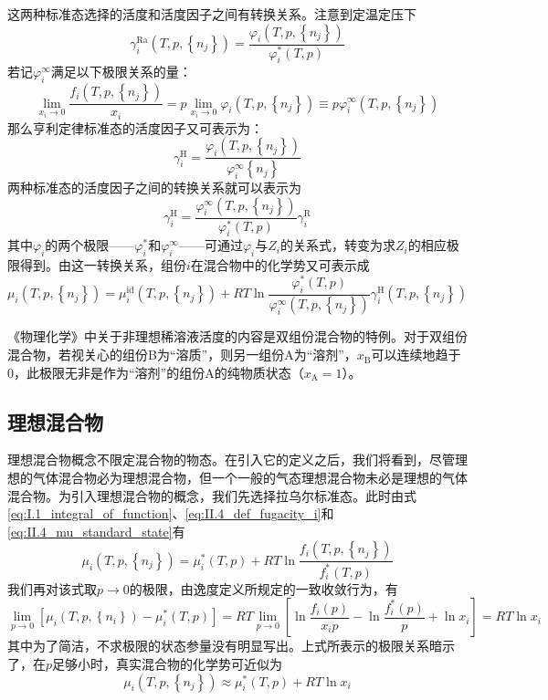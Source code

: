\documentclass[main.tex]{subfiles}
\begin{document}
这两种标准态选择的活度和活度因子之间有转换关系。注意到定温定压下
\[\gamma_i^\text{Ra}\left(T,p,\left\{n_j\right\}\right)              =\frac{\varphi_i\left(T,p,\left\{n_j\right\}\right)}{\varphi_i^*\left(T,p\right)}\]
若记$\varphi_i^\infty$满足以下极限关系的量：
\[  \lim_{x_i\to 0}\frac{f_i\left(T,p,\left\{n_j\right\}\right)}{x_i}  =p\lim_{x_i\to 0}\varphi_i\left(T,p,\left\{n_j\right\}\right)\equiv p\varphi_i^\infty\left(T,p,\left\{n_j\right\}\right)\]
那么亨利定律标准态的活度因子又可表示为：
\[\gamma_i^\text{H}=\frac{\varphi_i\left(T,p,\left\{n_j\right\}\right)}{\varphi_i^\infty\left\{n_j\right\}}\]
两种标准态的活度因子之间的转换关系就可以表示为
\[\gamma_i^\text{H}                                                  =\frac{\varphi_i^\infty\left(T,p,\left\{n_j\right\}\right)}{\varphi_i^*\left(T,p\right)}\gamma_i^\text{R}\]
其中$\varphi_i$的两个极限——$\varphi_i^*$和$\varphi_i^\infty$——可通过$\varphi_i$与$Z_i$的关系式，转变为求$Z_i$的相应极限得到。由这一转换关系，组份$i$在混合物中的化学势又可表示成
\begin{equation}\label{eq:II.4_Henry_standardstate_activity_factor}
  \mu_i\left(T,p,\left\{n_j\right\}\right)=\mu_i^\text{id}\left(T,p,\left\{n_j\right\}\right)+RT\ln\frac{\varphi_i^*\left(T,p\right)}{\varphi_i^\infty\left(T,p,\left\{n_j\right\}\right)}\gamma_i^\text{H}\left(T,p,\left\{n_j\right\}\right)
\end{equation}

《物理化学》中关于非理想稀溶液活度的内容是双组份混合物的特例。对于双组份混合物，若视关心的组份B为“溶质”，则另一组份A为“溶剂”，$x_\text{B}$可以连续地趋于0，此极限无非是作为“溶剂”的组份A的纯物质状态（$x_\text{A}=1$）。

\subsection{理想混合物}
理想混合物概念不限定混合物的物态。在引入它的定义之后，我们将看到，尽管理想的气体混合物必为理想混合物，但一个一般的气态理想混合物未必是理想的气体混合物。为引入理想混合物的概念，我们先选择拉乌尔标准态。此时由式\eqref{eq:I.1_integral_of_function}、\eqref{eq:II.4_def_fugacity_i}和\eqref{eq:II.4_mu_standard_state}有
\[\mu_i\left(T,p,\left\{n_j\right\}\right)=\mu_i^*\left(T,p\right)+RT\ln\frac{f_i\left(T,p,\left\{n_j\right\}\right)}{f_i^*\left(T,p\right)}\]
我们再对该式取$p\rightarrow 0$的极限，由逸度定义所规定的一致收敛行为，有
\[\lim_{p\to 0}\left[\mu_i\left(T,p,\left\{n_i\right\}\right)-\mu_i^*\left(T,p\right)\right]=RT\lim_{p\to 0}\left[\ln\frac{f_i\left(p\right)}{x_ip}-\ln\frac{f_i^*\left(p\right)}{p}+\ln x_i\right]=RT\ln x_i\]
其中为了简洁，不求极限的状态参量没有明显写出。上式所表示的极限关系暗示了，在$p$足够小时，真实混合物的化学势可近似为
\[\mu_i\left(T,p,\left\{n_j\right\}\right)\approx\mu_i^*\left(T,p\right)+RT\ln x_i\]
\end{document}
